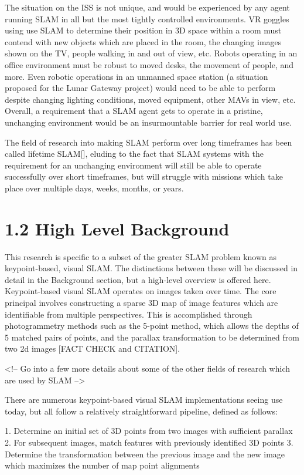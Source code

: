 \documentclass[12pt]{article}
\begin{document}
The situation on the ISS is not unique, and would be experienced by any agent running SLAM in all but the most tightly controlled environments. VR goggles using use SLAM to determine their position in 3D space within a room must contend with new objects which are placed in the room, the changing images shown on the TV, people walking in and out of view, etc. Robots operating in an office environment must be robust to moved desks, the movement of people, and more. Even robotic operations in an unmanned space station (a situation proposed for the Lunar Gateway project) would need to be able to perform despite changing lighting conditions, moved equipment, other MAVs in view, etc. Overall, a requirement that a SLAM agent gets to operate in a pristine, unchanging environment would be an insurmountable barrier for real world use.

The field of research into making SLAM perform over long timeframes has been called lifetime SLAM[], eluding to the fact that SLAM systems with the requirement for an unchanging environment will still be able to operate successfully over short timeframes, but will struggle with missions which take place over multiple days, weeks, months, or years.

\section{1.2 High Level Background}

This research is specific to a subset of the greater SLAM problem known as keypoint-based, visual SLAM. The distinctions between these will be discussed in detail in the Background section, but a high-level overview is offered here. Keypoint-based visual SLAM operates on images taken over time. The core principal involves constructing a sparse 3D map of image features which are identifiable from multiple perspectives. This is accomplished through photogrammetry methods such as the 5-point method, which allows the depths of 5 matched pairs of points, and the parallax transformation to be determined from two 2d images [FACT CHECK and CITATION].

<!-- Go into a few more details about some of the other fields of research which are used by SLAM -->

There are numerous keypoint-based visual SLAM implementations seeing use today, but all follow a relatively straightforward pipeline, defined as follows:

1. Determine an initial set of 3D points from two images with sufficient parallax
2. For subsequent images, match features with previously identified 3D points
3. Determine the transformation between the previous image and the new image which maximizes the number of map point alignments
\end{document}
